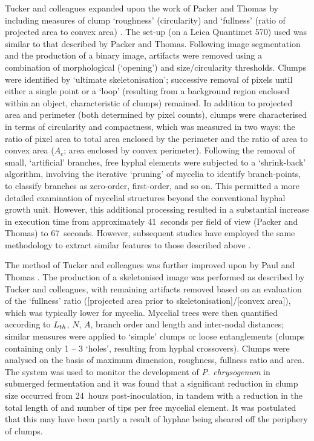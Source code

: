 Tucker and colleagues expanded upon the work of Packer and Thomas by including measures of clump \lq roughness' (circularity) and \lq fullness' (ratio of projected area to convex area) \cite{tucker1992}. The set-up (on a Leica Quantimet 570) used was similar to that described by Packer and Thomas. Following image segmentation and the production of a binary image, artifacts were removed using a combination of morphological (\lq opening') and size/circularity thresholds. Clumps were identified by \lq ultimate skeletonisation'; successive removal of pixels until either a single point or a \lq loop' (resulting from a background region enclosed within an object, characteristic of clumps) remained. In addition to projected area and perimeter (both determined by pixel counts), clumps were characterised in terms of circularity and compactness, which was measured in two ways: the ratio of pixel area to total area enclosed by the perimeter and the ratio of area to convex area ($A_c$; area enclosed by convex perimeter). Following the removal of small, \lq artificial' branches, free hyphal elements were subjected to a \lq shrink-back' algorithm, involving the iterative \lq pruning' of mycelia to identify branch-points, to classify branches as zero-order, first-order, and so on. This permitted a more detailed examination of mycelial structures beyond the conventional hyphal growth unit. However, this additional processing resulted in a substantial increase in execution time from approximately 41~seconds per field of view (Packer and Thomas) to 67~seconds. However, subsequent studies have employed the same methodology to extract similar features to those described above \cite{mcintyre1998,amanullah2000,li2000}.

The method of Tucker and colleagues was further improved upon by Paul and Thomas \cite{paul1998}. The production of a skeletonised image was performed as described by Tucker and colleagues, with remaining artifacts removed based on an evaluation of the \lq fullness' ratio ([projected area prior to skeletonisation]/[convex area]), which was typically lower for mycelia. Mycelial trees were then quantified according to $L_{th}$, $N$, $A$, branch order and length and inter-nodal distances; similar measures were applied to \lq simple' clumps or loose entanglements (clumps containing only 1 -- 3 \lq holes', resulting from hyphal crossovers). Clumps were analysed on the basis of maximum dimension, roughness, fullness ratio and area. The system was used to monitor the development of \emph{P. chrysogenum} in submerged fermentation and it was found that a significant reduction in clump size occurred from 24~hours post-inoculation, in tandem with a reduction in the total length of and number of tips per free mycelial element. It was postulated that this may have been partly a result of hyphae being sheared off the periphery of clumps.

